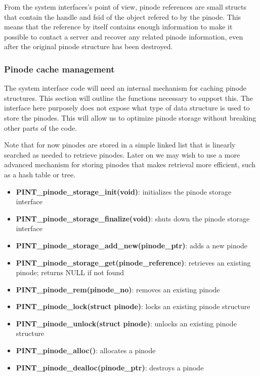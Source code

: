 \documentclass[11pt, letterpaper]{article}
\begin{document}
From the system interfaces's point of view, pinode references are
small structs that contain the handle and fsid of the object
refered to by the pinode.  This means that the reference by itself
contains enough information to make it possible to contact a
server and recover any related pinode information, even after
the original pinode structure has been destroyed.

\subsubsection{Pinode cache management}

The system interface code will need an internal mechanism for
caching
pinode structures.  This section will outline the functions necessary to
support this.  The interface here purposely does not expose what type of
data structure is used to store the pinodes.  This will allow us to
optimize pinode storage without breaking other parts of the code.  

Note that for now pinodes are stored in a simple linked list that is
linearly searched as needed to retrieve pinodes.  Later on we may wish
to use a more advanced mechanism for storing pinodes that makes
retrieval more efficient, such as a hash table or tree.

\begin{itemize}
	\item \textbf{PINT\_pinode\_storage\_init(void)}:  initializes
the pinode storage interface
	\item \textbf{PINT\_pinode\_storage\_finalize(void)}:  shuts
down the pinode storage interface
	\item \textbf{PINT\_pinode\_storage\_add\_new(pinode\_ptr)}:
adds a new pinode 
	\item \textbf{PINT\_pinode\_storage\_get(pinode\_reference)}:
retrieves an existing pinode; returns NULL if not found 
	\item \textbf{PINT\_pinode\_rem(pinode\_no)}: removes an
existing pinode
	\item \textbf{PINT\_pinode\_lock(struct pinode)}: locks an
existing pinode structure
	\item \textbf{PINT\_pinode\_unlock(struct pinode)}: unlocks an
existing pinode structure 
	\item \textbf{PINT\_pinode\_alloc()}: allocates a pinode 
	\item \textbf{PINT\_pinode\_dealloc(pinode\_ptr)}: destroys a
pinode 
\end{itemize}
\end{document}
